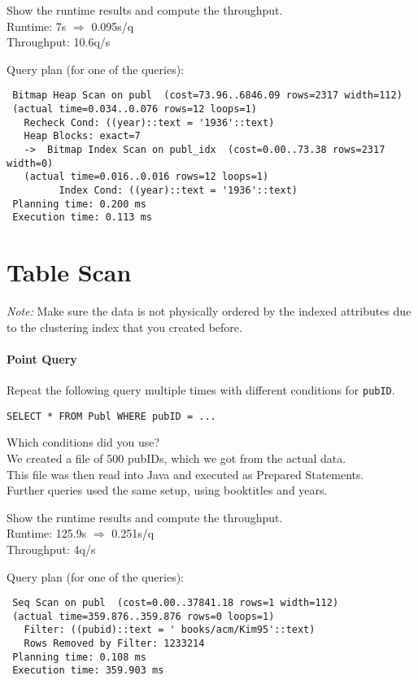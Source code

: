 \documentclass[11pt]{scrartcl}
\begin{document}
\smallskip\noindent
Show the runtime results and compute the throughput.\\
Runtime: 7s $\Rightarrow$ 0.095s/q\\
Throughput: 10.6q/s

\smallskip\noindent
Query plan (for one of the queries):
{\small
\begin{verbatim}
 Bitmap Heap Scan on publ  (cost=73.96..6846.09 rows=2317 width=112)
 (actual time=0.034..0.076 rows=12 loops=1)
   Recheck Cond: ((year)::text = '1936'::text)
   Heap Blocks: exact=7
   ->  Bitmap Index Scan on publ_idx  (cost=0.00..73.38 rows=2317 width=0)
   (actual time=0.016..0.016 rows=12 loops=1)
         Index Cond: ((year)::text = '1936'::text)
 Planning time: 0.200 ms
 Execution time: 0.113 ms
\end{verbatim}
}


\section{Table Scan}

\noindent \emph{Note:} Make sure the data is not physically ordered by
the indexed attributes due to the clustering index that you created
before.

\paragraph{Point Query}

Repeat the following query multiple times with different conditions for {\tt pubID}.

{\small
\begin{verbatim}
SELECT * FROM Publ WHERE pubID = ...
\end{verbatim}
}

\noindent
Which conditions did you use?\\
We created a file of 500 pubIDs, which we got from the actual data.\\
This file was then read into Java and executed as Prepared Statements.\\
Further queries used the same setup, using booktitles and years.

\smallskip\noindent
Show the runtime results and compute the throughput.\\
Runtime: 125.9s $\Rightarrow$ 0.251s/q\\
Throughput: 4q/s

\smallskip\noindent
Query plan (for one of the queries):
{\small
\begin{verbatim}
 Seq Scan on publ  (cost=0.00..37841.18 rows=1 width=112)
 (actual time=359.876..359.876 rows=0 loops=1)
   Filter: ((pubid)::text = ' books/acm/Kim95'::text)
   Rows Removed by Filter: 1233214
 Planning time: 0.108 ms
 Execution time: 359.903 ms
\end{verbatim}
}
\end{document}
